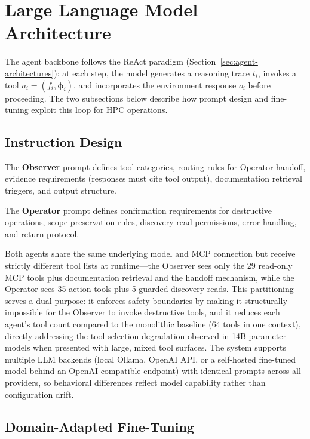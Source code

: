 \section{Large Language Model Architecture}
\label{sec:llm-architecture}

The agent backbone follows the ReAct paradigm (Section~\ref{sec:agent-architectures}): at each step, the model generates a reasoning trace $t_i$, invokes a tool $a_i = (f_i, \boldsymbol{\phi}_i)$, and incorporates the environment response $o_i$ before proceeding. The two subsections below describe how prompt design and fine-tuning exploit this loop for HPC operations.

\subsection{Instruction Design}

The \textbf{Observer} prompt defines tool categories, routing rules for Operator handoff, evidence requirements (responses must cite tool output), documentation retrieval triggers, and output structure.

The \textbf{Operator} prompt defines confirmation requirements for destructive operations, scope preservation rules, discovery-read permissions, error handling, and return protocol.

Both agents share the same underlying model and MCP connection but receive strictly different tool lists at runtime---the Observer sees only the 29 read-only MCP tools plus documentation retrieval and the handoff mechanism, while the Operator sees 35 action tools plus 5 guarded discovery reads. This partitioning serves a dual purpose: it enforces safety boundaries by making it structurally impossible for the Observer to invoke destructive tools, and it reduces each agent's tool count compared to the monolithic baseline (64 tools in one context), directly addressing the tool-selection degradation observed in 14B-parameter models when presented with large, mixed tool surfaces. The system supports multiple LLM backends (local Ollama, OpenAI API, or a self-hosted fine-tuned model behind an OpenAI-compatible endpoint) with identical prompts across all providers, so behavioral differences reflect model capability rather than configuration drift.

\subsection{Domain-Adapted Fine-Tuning}
\label{sec:fine-tuning}

